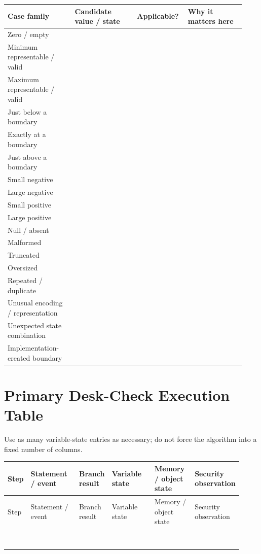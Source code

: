 \documentclass[10pt]{article}
\begin{document}
\begin{longtable}{@{}L{0.27\linewidth}L{0.25\linewidth}L{0.18\linewidth}L{0.23\linewidth}@{}}
\toprule
Case family & Candidate value / state & Applicable? & Why it matters here \\
\midrule
Zero / empty & & & \\
Minimum representable / valid & & & \\
Maximum representable / valid & & & \\
Just below a boundary & & & \\
Exactly at a boundary & & & \\
Just above a boundary & & & \\
Small negative & & & \\
Large negative & & & \\
Small positive & & & \\
Large positive & & & \\
Null / absent & & & \\
Malformed & & & \\
Truncated & & & \\
Oversized & & & \\
Repeated / duplicate & & & \\
Unusual encoding / representation & & & \\
Unexpected state combination & & & \\
Implementation-created boundary & & & \\
\bottomrule
\end{longtable}
\clearpage

\section{Primary Desk-Check Execution Table}
Use as many variable-state entries as necessary; do not force the algorithm into a fixed number of columns.
\small
\begin{longtable}{@{}C{0.06\linewidth}L{0.22\linewidth}L{0.14\linewidth}L{0.20\linewidth}L{0.18\linewidth}L{0.12\linewidth}@{}}
\toprule
Step & Statement / event & Branch result & Variable state & Memory / object state & Security observation \\
\midrule
\endfirsthead
\toprule
Step & Statement / event & Branch result & Variable state & Memory / object state & Security observation \\
\midrule
\endhead
\rule{0pt}{2.7em} & & & & & \\
\rule{0pt}{2.7em} & & & & & \\
\rule{0pt}{2.7em} & & & & & \\
\rule{0pt}{2.7em} & & & & & \\
\rule{0pt}{2.7em} & & & & & \\
\rule{0pt}{2.7em} & & & & & \\
\rule{0pt}{2.7em} & & & & & \\
\rule{0pt}{2.7em} & & & & & \\
\bottomrule
\end{longtable}
\normalsize
\end{document}
